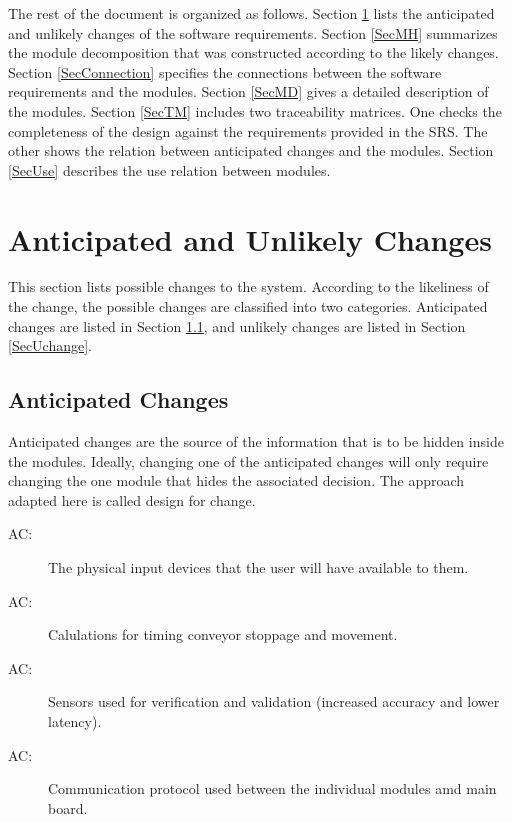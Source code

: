 \documentclass[12pt, titlepage]{article}
\newcounter{acnum}
\newcommand{\actheacnum}{AC\theacnum}
\begin{document}
The rest of the document is organized as follows. Section
\ref{SecChange} lists the anticipated and unlikely changes of the software
requirements. Section \ref{SecMH} summarizes the module decomposition that
was constructed according to the likely changes. Section \ref{SecConnection}
specifies the connections between the software requirements and the
modules. Section \ref{SecMD} gives a detailed description of the
modules. Section \ref{SecTM} includes two traceability matrices. One checks
the completeness of the design against the requirements provided in the SRS. The
other shows the relation between anticipated changes and the modules. Section
\ref{SecUse} describes the use relation between modules.

\section{Anticipated and Unlikely Changes} \label{SecChange}

This section lists possible changes to the system. According to the likeliness
of the change, the possible changes are classified into two
categories. Anticipated changes are listed in Section \ref{SecAchange}, and
unlikely changes are listed in Section \ref{SecUchange}.

\subsection{Anticipated Changes} \label{SecAchange}

Anticipated changes are the source of the information that is to be hidden
inside the modules. Ideally, changing one of the anticipated changes will only
require changing the one module that hides the associated decision. The approach
adapted here is called design for
change.

\begin{description}
\item[ \actheacnum \label{acphy}:] The physical input
devices that the user will have available to them.
\item[ \actheacnum \label{accal}:] Calulations for timing conveyor
stoppage and movement.
\item[ \actheacnum \label{acsen}:] Sensors used for verification and 
validation (increased accuracy and lower latency).
\item[ \actheacnum \label{accom}:] Communication protocol used 
between the individual modules amd main board.

\end{description}
\end{document}
